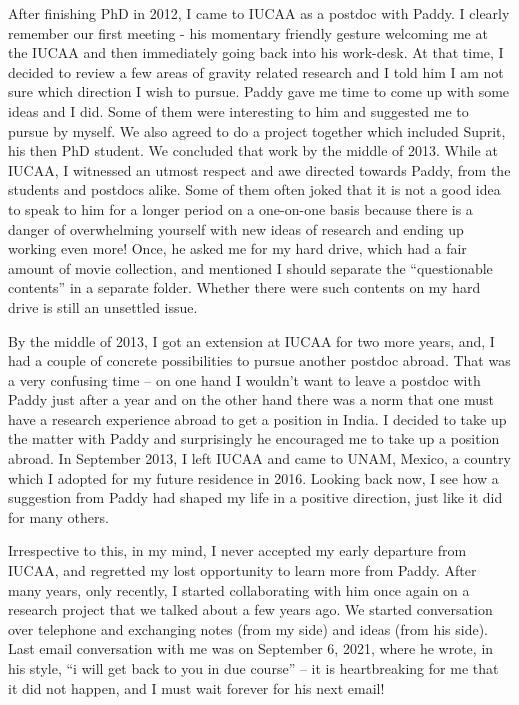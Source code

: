 \documentclass[prd, preprint, longbibliography, 11pt]{revtex4-1}
\begin{document}
After finishing PhD in 2012, I came to IUCAA as a postdoc with Paddy. I clearly remember our first meeting - his momentary friendly gesture welcoming me at the IUCAA and then immediately going back into his work-desk. At that time, I decided to review a few areas of gravity related research and I told him I am not sure which direction I wish to pursue. Paddy gave me time to come up with some ideas and I did. Some of them were interesting to him and suggested me to pursue by myself. We also agreed to do a project together which included Suprit, his then PhD student. We concluded that work by the middle of 2013. While at IUCAA, I witnessed an utmost respect and awe directed towards Paddy, from the students and postdocs alike. Some of them often joked that it is not a good idea to speak to him for a longer period on a one-on-one basis because there is a danger of overwhelming yourself with new ideas of research and ending up working even more! Once, he asked me for my hard drive, which had  a fair amount of movie collection, and mentioned I should separate the “questionable contents” in a separate folder. Whether there were such contents on my hard drive is still an unsettled issue. 

By the middle of 2013, I got an extension at IUCAA for two more years, and, I had a couple of concrete possibilities to pursue another postdoc abroad. That was a very confusing time – on one hand I wouldn’t want to leave a postdoc with Paddy just after a year and on the other hand there was a norm that one must have a research experience abroad to get a position in India. I decided to take up the matter with Paddy and surprisingly he encouraged me to take up a position abroad. In September 2013, I left IUCAA and came to UNAM, Mexico, a country which I adopted for my future residence in 2016. Looking back now, I see how a suggestion from Paddy had shaped my life in a positive direction, just like it did for many others.

Irrespective to this, in my mind, I never accepted my early departure from IUCAA, and regretted my lost opportunity to learn more from Paddy. After many years, only recently, I started collaborating with him once again on a research project that we talked about a few years ago. We started conversation over telephone and exchanging notes (from my side) and ideas (from his side). Last email conversation with me was on September 6, 2021, where he wrote, in his style, “i will get back to you in due course” – it is heartbreaking for me that it did not happen, and I must wait forever for his next email!
\end{document}
